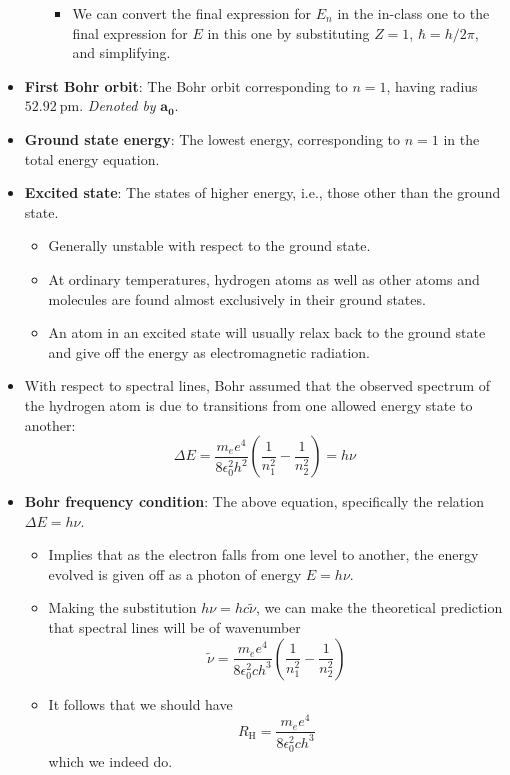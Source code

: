 \documentclass[../notes.tex]{subfiles}
\begin{document}
\begin{itemize}
\begin{itemize}
\begin{itemize}
            \item We can convert the final expression for $E_n$ in the in-class one to the final expression for $E$ in this one by substituting $Z=1$, $\hbar=h/2\pi$, and simplifying.
        \end{itemize}
    \end{itemize}
    \item \textbf{First Bohr orbit}: The Bohr orbit corresponding to $n=1$, having radius $\SI{52.92}{\pico\meter}$. \emph{Denoted by} $\bm{a_0}$.
    \item \textbf{Ground state energy}: The lowest energy, corresponding to $n=1$ in the total energy equation.
    \item \textbf{Excited state}: The states of higher energy, i.e., those other than the ground state.
    \begin{itemize}
        \item Generally unstable with respect to the ground state.
        \item At ordinary temperatures, hydrogen atoms as well as other atoms and molecules are found almost exclusively in their ground states.
        \item An atom in an excited state will usually relax back to the ground state and give off the energy as electromagnetic radiation.
    \end{itemize}
    \item With respect to spectral lines, Bohr assumed that the observed spectrum of the hydrogen atom is due to transitions from one allowed energy state to another:
    \begin{equation*}
        \Delta E = \frac{m_ee^4}{8\epsilon_0^2h^2}\left( \frac{1}{n_1^2}-\frac{1}{n_2^2} \right) = h\nu
    \end{equation*}
    \item \textbf{Bohr frequency condition}: The above equation, specifically the relation $\Delta E=h\nu$.
    \begin{itemize}
        \item Implies that as the electron falls from one level to another, the energy evolved is given off as a photon of energy $E=h\nu$.
        \item Making the substitution $h\nu=hc\tilde{\nu}$, we can make the theoretical prediction that spectral lines will be of wavenumber
        \begin{equation*}
            \tilde{\nu} = \frac{m_ee^4}{8\epsilon_0^2ch^3}\left( \frac{1}{n_1^2}-\frac{1}{n_2^2} \right)
        \end{equation*}
        \item It follows that we should have
        \begin{equation*}
            R_\text{H} = \frac{m_ee^4}{8\epsilon_0^2ch^3}
        \end{equation*}
        which we indeed do.
    \end{itemize}
\end{itemize}
\end{document}
